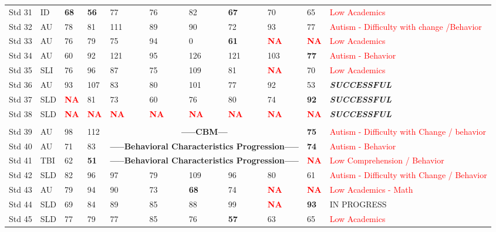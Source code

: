 \documentclass[twoside]{article}
\begin{document}
\begin{tiny}
\begin{landscape}
\begin{longtable}{p{1.5cm}p{1.5cm}p{1.5cm}p{1.5cm}p{1.75cm}p{1.75cm}p{1.75cm}p{1.75cm}p{1.75cm}p{1.75cm}p{2.5cm}@{}}
Std 31 & ID & \textbf{68} & \textbf{56} & 77 & 76 & 82 & \textbf{67} & 70 & 65 & \textcolor{red}{Low Academics} \\
Std 32 & AU & 78 & 81 & 111 & 89 & 90 & 72 & 93 & 77 & \textcolor{red}{Autism - Difficulty with change /Behavior} \\
Std 33 & AU & 76 & 79 & 75 & 94 & 0 & \textbf{61} & \textcolor{red}{\textbf{NA}} & \textcolor{red}{\textbf{NA}} & \textcolor{red}{Low Academics}\\
Std 34 & AU & 60 & 92 & 121 & 95 & 126 & 121 & 103 & \textbf{77} & \textcolor{red}{Autism - Behavior}\\
Std 35 & SLI & 76 & 96 & 87 & 75 & 109 & 81 & \textcolor{red}{\textbf{NA}} & 70 & \textcolor{red}{Low Academics}\\
Std 36 & AU & 93 & 107 & 83 &80 & 101 & 77 & 92 & 53 & \textbf{\textit{SUCCESSFUL}}\\
Std 37 & SLD & \textcolor{red}{\textbf{NA}} & 81 & 73 & 60 & 76 & 80 & 74 & \textbf{92} & \textbf{\textit{SUCCESSFUL}}\\
Std 38 & SLD & \textcolor{red}{\textbf{NA}} & \textcolor{red}{\textbf{NA}} & \textcolor{red}{\textbf{NA}} & \textcolor{red}{\textbf{NA}} & \textcolor{red}{\textbf{NA}} & \textcolor{red}{\textbf{NA}} & \textcolor{red}{\textbf{NA}} & \textcolor{red}{\textbf{NA}} & \textbf{\textit{SUCCESSFUL}}\\
\hline\\
Std 39 & AU & 98 & 112 & \multicolumn{5}{c}{\textbf{-----CBM---}} & \textbf{75} & \textcolor{red}{Autism - Difficulty with Change / behavior}\\
Std 40 & AU & 71 & 83 & \multicolumn{5}{c}{\textbf{-----Behavioral Characteristics Progression-----}} & \textbf{74} & \textcolor{red}{Autism - Behavior}\\
Std 41 & TBI & 62 & \textbf{51} & \multicolumn{5}{c}{\textbf{-----Behavioral Characteristics Progression-----}} & \textcolor{red}{\textbf{NA}} & \textcolor{red}{Low Comprehension / Behavior}\\
Std 42 & SLD & 82 & 96 & 97 & 79 & 109 & 96 & 80 & 61 & \textcolor{red}{Autism - Difficulty with Change / Behavior}\\
Std 43 & AU & 79 & 94 & 90 &73 & \textbf{68} & 74 & \textcolor{red}{\textbf{NA}} & \textcolor{red}{\textbf{NA}} & \textcolor{red}{Low Academics - Math}\\
Std 44 & SLD & 69 & 84 & 89 & 85 & 88 & 99 & \textcolor{red}{\textbf{NA}} & \textbf{93} & IN PROGRESS\\ 
Std 45 & SLD & 77 & 79 & 77 & 85 & 76& \textbf{57} & 63 & 65 & \textcolor{red}{Low Academics}\\

\end{longtable}
\end{landscape}
\end{tiny}
\end{document}
